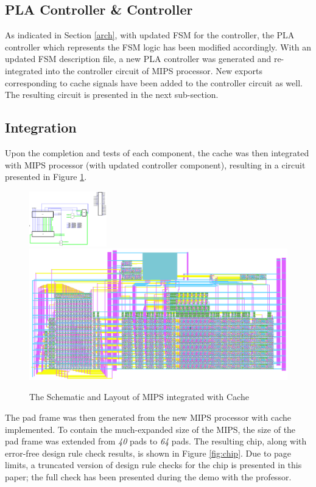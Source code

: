 \documentclass[conference]{IEEEtran}
\begin{document}
\subsection{PLA Controller \& Controller}\label{subsec:controller}
As indicated in Section \ref{arch}, with updated FSM for the controller, the PLA controller which represents the FSM logic has been modified accordingly. With an updated FSM description file, a new PLA controller was generated and re-integrated into the controller circuit of MIPS processor. New exports corresponding to cache signals have been added to the controller circuit as well. The resulting circuit is presented in the next sub-section.

\subsection{Integration}\label{subsec:integration}
Upon the completion and tests of each component, the cache was then integrated with MIPS processor (with updated controller component), resulting in a circuit presented in Figure \ref{fig:mips}.

\begin{figure}[h!]
  \centering
    \includegraphics[width=0.3\textwidth]{mips_sch} \includegraphics[scale=0.3]{mips_lay}
  \caption{The Schematic and Layout of MIPS integrated with Cache}
  \label{fig:mips}
\end{figure}

The pad frame was then generated from the new MIPS processor with cache implemented. To contain the much-expanded size of the MIPS, the size of the pad frame was extended from \textit{40} pads to \textit{64} pads. The resulting chip, along with error-free design rule check results, is shown in Figure \ref{fig:chip}. Due to page limits, a truncated version of design rule checks for the chip is presented in this paper; the full check has been presented during the demo with the professor.
\end{document}
